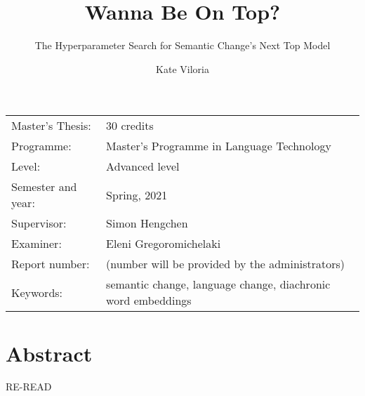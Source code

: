 \documentclass[11pt, a4paper]{article}
\title{Wanna Be On Top?}
\subtitle{The Hyperparameter Search for Semantic Change's Next Top Model}
\author{Kate Viloria}
\begin{document}
\begin{titlepage}

\maketitle

\vfill

\begingroup
\renewcommand*{\arraystretch}{1.2}
\begin{tabular}{l@{\hskip 20mm}l}
\hline
Master's Thesis: & 30 credits \\
Programme: & Master’s Programme in Language Technology\\
Level: & Advanced level \\
Semester and year: & Spring, 2021\\
Supervisor: & Simon Hengchen\\
Examiner: & Eleni Gregoromichelaki\\
Report number: & (number will be provided by the administrators) \\
Keywords: & semantic change, language change, diachronic word embeddings
\end{tabular}
\endgroup

\thispagestyle{empty}
\end{titlepage}

\newpage
\singlespacing
\section*{Abstract}

RE-READ
\end{document}
